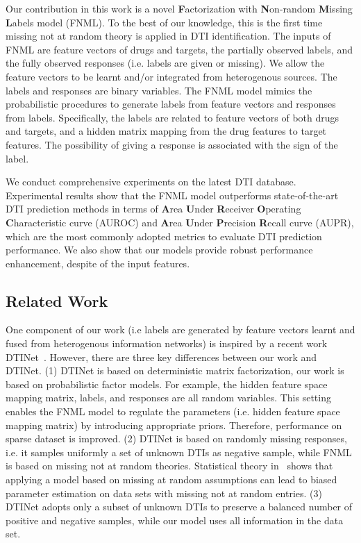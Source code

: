 \documentclass[conference]{IEEEtran}
\begin{document}
Our contribution in this work is a novel \textbf{F}actorization with \textbf{N}on-random \textbf{M}issing \textbf{L}abels model (FNML). To the best of our knowledge, this is the first time missing not at random theory is applied in DTI identification. The inputs of FNML are feature vectors of drugs and targets, the partially observed labels, and the fully observed responses (i.e. labels are given or missing). We allow the feature vectors to be learnt and/or integrated from heterogenous sources. The labels and responses are binary variables. The FNML model mimics the probabilistic procedures to generate labels from feature vectors and responses from labels. Specifically, the labels are related to feature vectors of both drugs and targets, and a hidden matrix mapping from the drug features to target features. The possibility of giving a response is associated with the sign of the label.

We conduct comprehensive experiments on the latest DTI database. Experimental results show that the FNML model outperforms state-of-the-art DTI prediction methods in terms of \textbf{A}rea \textbf{U}nder \textbf{R}eceiver \textbf{O}perating \textbf{C}haracteristic curve (AUROC) and \textbf{A}rea \textbf{U}nder \textbf{P}recision \textbf{R}ecall curve (AUPR), which are the most commonly adopted metrics to evaluate DTI prediction performance. We also show that our models provide robust performance enhancement, despite of the input features.

\subsection{Related Work}

One component of our work (i.e labels are generated by feature vectors learnt and fused from heterogenous information networks) is inspired by a recent work DTINet~\cite{Luo2017Network}. However, there are three key differences between our work and DTINet. (1) DTINet is based on deterministic matrix factorization, our work is based on probabilistic factor models. For example, the hidden feature space mapping matrix, labels, and responses are all random variables. This setting enables the FNML model to regulate the parameters (i.e. hidden feature space mapping matrix) by introducing appropriate priors. Therefore, performance on sparse dataset is improved. (2) DTINet is based on randomly missing responses, i.e. it samples uniformly a set of unknown DTIs as negative sample, while FNML is based on missing not at random theories. Statistical theory in~\cite{Little1987Statistical} shows that applying a model based on missing at random assumptions can lead to biased parameter estimation on data sets with missing not at random entries. (3) DTINet adopts only a subset of unknown DTIs to preserve a balanced number of positive and negative samples, while our model uses all information in the data set.
\end{document}
